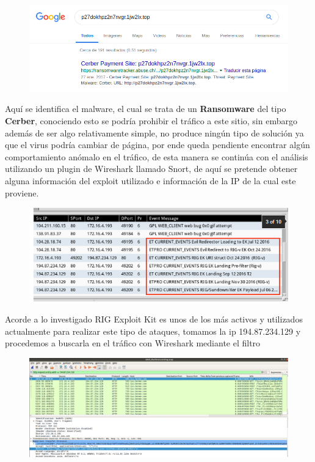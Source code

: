 \documentclass[a4paper,10pt]{article}
\begin{document}
\begin{figure}[!hp]
\centering
\includegraphics[scale=0.5]{Wireshark/google.png} 
\caption{}
\end{figure}

\medskip

Aquí se identifica el malware, el cual se trata de un \textbf{Ransomware}
 del tipo \textbf{Cerber}, conociendo esto se podría prohibir el tráfico a este sitio, sin embargo además de ser algo relativamente simple, no produce ningún tipo de solución ya que el virus podría cambiar de página, por ende queda pendiente encontrar algún comportamiento anómalo en el tráfico, de esta manera se continúa con el análisis utilizando un plugin de Wireshark llamado Snort, de aquí se pretende obtener alguna información del exploit utilizado e información de la IP de la cual este proviene.

\medskip
\begin{figure}[!htp]
\centering
\includegraphics[scale=0.5]{Wireshark/Snort.png} 
\caption{}
\end{figure}
Acorde a lo investigado RIG Exploit Kit es unos de los más activos y utilizados actualmente para realizar este tipo de ataques, tomamos la ip 194.87.234.129 y procedemos a buscarla en el tráfico con Wireshark mediante el filtro
\medskip
\begin{figure}[!htp]
\centering
\includegraphics[scale=0.3]{Wireshark/5.png} 
\caption{}
\end{figure}
\end{document}
